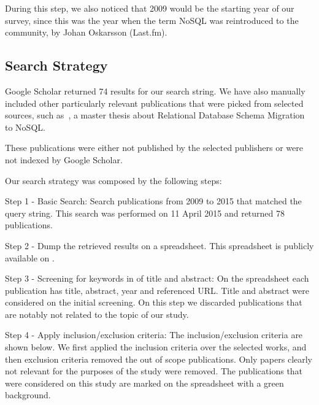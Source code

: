 \documentclass{article}
\begin{document}
During this step, we also noticed that 2009 would be the starting year of our survey, since this was the year when the term NoSQL was reintroduced to the community, by Johan Oskarsson (Last.fm)\cite{ericevans}.

\subsection{Search Strategy}\label{sec:searchStrategy}

Google Scholar returned 74 results for our search string. We have also manually included other particularly relevant publications that were picked from selected sources, such as~\cite{mastersthesrilinda}, a master thesis about Relational Database Schema Migration to NoSQL.

These publications were either not published by the selected publishers or were not indexed by Google Scholar. 

Our search strategy was composed by the following steps:

Step 1 - Basic Search: Search publications from 2009 to 2015 that matched the query string. This search was performed on 11 April 2015 and returned 78 publications. 

Step 2 - Dump the retrieved results on a spreadsheet. This spreadsheet is publicly available on \cite{systematicMappingSpreadsheet}.

Step 3 - Screening for keywords in of title and abstract: On the spreadsheet each publication has title, abstract, year and referenced URL. Title and abstract were considered on the initial screening. On this step we discarded publications that are notably not related to the topic of our study. %

Step 4 - Apply inclusion/exclusion criteria: The inclusion/exclusion criteria are shown below. We first applied the inclusion criteria over the selected works, and then exclusion criteria removed the out of scope publications. Only papers clearly not relevant for the purposes of the study were removed. The publications that were considered on this study are marked on the spreadsheet with a green background.
\end{document}
